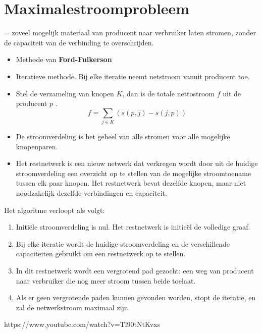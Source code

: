 \documentclass{report}
\begin{document}
\section{Maximalestroomprobleem}
= zoveel mogelijk materiaal van producent naar verbruiker laten stromen, zonder de capaciteit van de verbinding te overschrijden.
\begin{itemize}
	\item [\info] Methode van \textbf{Ford-Fulkerson} 
	\item [\info] Iteratieve methode. Bij elke iteratie neemt netstroom vanuit producent toe.
	\item [\info] Stel de verzameling van knopen $K$, dan is de totale nettostroom $f$ uit de producent $p$ . 
		$$f = \sum_{j \in K} (s(p, j) - s(j, p))$$
	\item [\info] De stroomverdeling is het geheel van alle stromen voor alle mogelijke knopenparen. 
	\item [\info] Het restnetwerk is een nieuw netwerk dat verkregen wordt door uit de huidige stroomverdeling een overzicht op te stellen van de mogelijke stroomtoename tussen elk paar knopen. Het restnetwerk bevat dezelfde knopen, maar niet noodzakelijk dezelfde verbindingen en capaciteit.
\end{itemize}
Het algoritme verloopt als volgt:
\begin{enumerate}
	\item Initiële stroomverdeling is nul. Het restnetwerk is initieël de volledige graaf.
	\item Bij elke iteratie wordt de huidige stroomverdeling en de verschillende capaciteiten gebruikt om een restnetwerk op te stellen.
	\item In dit restnetwerk wordt een vergrotend pad gezocht: een weg van producent naar verbruiker die nog meer stroom tussen beide toelaat.
	\item Als er geen vergrotende paden kunnen gevonden worden, stopt de iteratie, en zal de netwerkstroom maximaal zijn.
\end{enumerate}
https://www.youtube.com/watch?v=Tl90tNtKvxs
\end{document}
